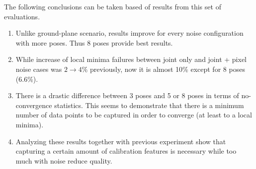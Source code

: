 \documentclass[english, printversion, nomenclature, notitle]{tuvisionthesis} %
\begin{document}
\begin{table}[]
	\caption[Results from testing with Charuco Patterns]{Results from testing with Charuco  calibration features on ground. The results depicts several trends between calibration pose count, type of induced noise and success/ failure statistics}
\end{table}

The following conclusions can be taken based of results from this set of evaluations.
\begin{enumerate}
	\item 
	Unlike ground-plane scenario, results improve for every noise configuration with more poses. Thus 8 poses provide best results.
	\item
	While increase of local minima failures between joint only and joint + pixel noise cases was $2 \to 4\%$ previously, now it is almost 10\% except for 8 poses (6.6\%).
	\item 
	There is a drastic difference between 3 poses and 5 or 8 poses in terms of no-convergence statistics. This seems to demonstrate that there is a minimum number of data points to be captured in order to converge (at least to a local minima).
	\item 
	Analyzing these results together with previous experiment show that capturing a certain amount of calibration features is necessary while too much with noise reduce quality.
\end{enumerate}
\end{document}
